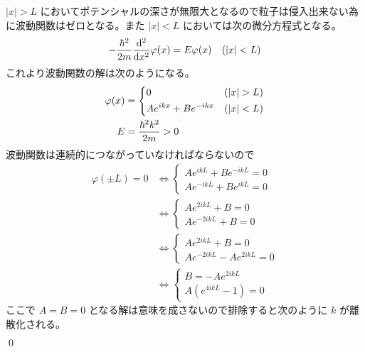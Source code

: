 \documentclass[uplatex,dvipdfmx,a4paper,11pt]{jlreq}
\makeatletter
\theoremstyle{definition}
\renewenvironment{proof}[1][\proofname]{\par
  \normalfont
  \topsep6\p@\@plus6\p@ \trivlist
  \item[\hskip\labelsep{\bfseries #1}\@addpunct{\bfseries}]\ignorespaces\quad\par
}{%
  \qed\endtrivlist\@endpefalse
}
\renewcommand\proofname{証明}
\makeatother
\begin{document}
\begin{proof}
  $|x| > L$ においてポテンシャルの深さが無限大となるので粒子は侵入出来ない為に波動関数はゼロとなる。また $|x| < L$ においては次の微分方程式となる。
  \begin{align}
    -\frac{\hbar^2}{2m}\dv[2]{x}\varphi(x) & = E\varphi(x) & (|x| < L)
  \end{align}
  これより波動関数の解は次のようになる。
  \begin{align}
    \varphi(x) & = \begin{dcases}
                     0                    & (|x| > L) \\
                     Ae^{ikx} + Be^{-ikx} & (|x| < L)
                   \end{dcases} \\
    E          & = \frac{\hbar^2k^2}{2m} > 0
  \end{align}
  波動関数は連続的につながっていなければならないので
  \begin{align}
    \varphi(\pm L) = 0 & \iff \begin{cases}
                                Ae^{ikL} + Be^{-ikL} = 0 \\
                                Ae^{-ikL} + Be^{ikL} = 0
                              \end{cases}  \\
                       & \iff \begin{cases}
                                Ae^{2ikL} + B = 0 \\
                                Ae^{-2ikL} + B = 0
                              \end{cases}         \\
                       & \iff \begin{cases}
                                Ae^{2ikL} + B = 0 \\
                                Ae^{-2ikL} - Ae^{2ikL} = 0
                              \end{cases} \\
                       & \iff \begin{cases}
                                B = -Ae^{2ikL} \\
                                A(e^{4ikL} - 1) = 0
                              \end{cases}
  \end{align}
  ここで $A = B = 0$ となる解は意味を成さないので排除すると次のように $k$ が離散化される。
  \begin{align}

\end{align}
\end{proof}
\end{document}
